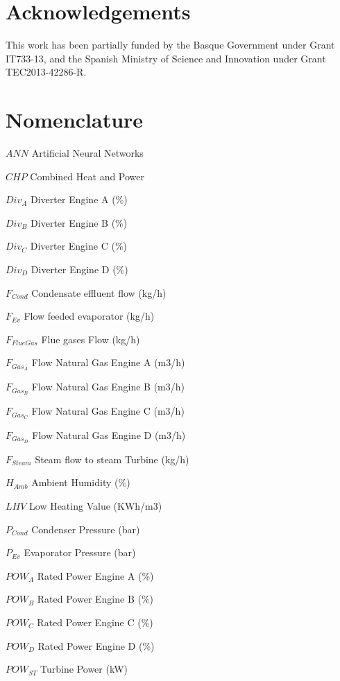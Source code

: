 \documentclass[preprint,12pt,authoryear]{elsarticle}
\begin{document}

\section{Acknowledgements}
This work has been partially funded by the Basque Government under Grant IT733-13, and the Spanish Ministry of Science and Innovation under Grant TEC2013-42286-R.


\section{Nomenclature}

$ANN$	Artificial Neural Networks 
\par $CHP$	Combined Heat and Power
\par $Div_A$	Diverter Engine A (\%)
\par $Div_B$	Diverter Engine B (\%)
\par $Div_C$	Diverter Engine C (\%)
\par $Div_D$	Diverter Engine D (\%)
\par $F_{Cond}$	Condensate effluent flow (kg/h) 
\par $F_{Ev}$	Flow feeded evaporator (kg/h) 
\par $F_{FlueGas}$	Flue gases Flow (kg/h) 
\par $F_{Gas_A}$	Flow Natural Gas Engine A (m3/h) 
\par $F_{Gas_B}$	Flow Natural Gas Engine B (m3/h) 
\par $F_{Gas_C}$	Flow Natural Gas Engine C (m3/h) 
\par $F_{Gas_D}$	Flow Natural Gas Engine D (m3/h) 
\par $F_{Steam}$	Steam flow to steam Turbine (kg/h)
\par $H_{Amb}$	Ambient Humidity (\%)
\par $LHV$	Low Heating Value (KWh/m3)
\par $P_{Cond}$	Condenser Pressure (bar)
\par $P_{Ev}$	Evaporator Pressure (bar) 
\par $POW_A$	Rated Power Engine A (\%) 
\par $POW_B$	Rated Power Engine B (\%) 
\par $POW_C$	Rated Power Engine C (\%) 
\par $POW_D$	Rated Power Engine D (\%) 
\par $POW_{ST}$	Turbine Power (kW)
\end{document}
